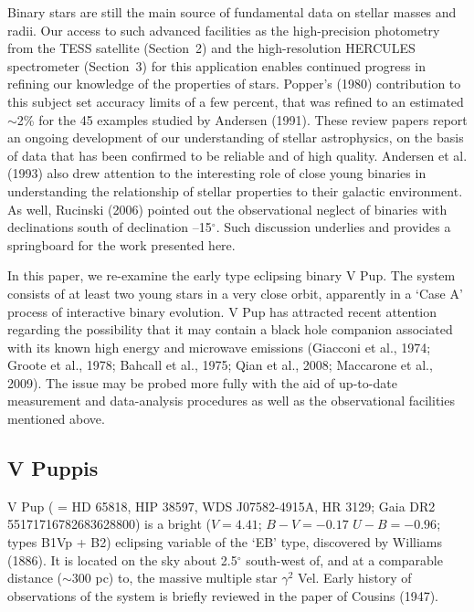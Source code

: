 \documentclass[useAMS,usenatbib]{mnras}                                                                           \usepackage[pdftex]{graphicx}
\begin{document}
Binary stars are still the main source of fundamental data on stellar masses and radii.  
Our access to such advanced facilities as the high-precision photometry
from the TESS satellite (Section~2) and
the high-resolution HERCULES spectrometer (Section~3) for this application enables 
continued progress in refining our knowledge of the properties of stars.  
Popper's (1980) contribution to this subject set accuracy limits of 
a few percent, that was refined to an estimated $\sim$2\% for the 45 
examples studied by Andersen (1991). These review papers report 
an ongoing development of our understanding of stellar astrophysics, 
on the basis of data that has been confirmed to be reliable and of high 
quality.  Andersen et al. (1993) also drew attention to the 
interesting role of close young binaries in understanding the 
relationship of stellar properties to their galactic environment.  
As well, Rucinski (2006) pointed out the observational
neglect of binaries with declinations south of declination  --15$^{\circ}$.  
Such discussion underlies and provides a springboard for the work 
presented here.  

In this paper,
we re-examine the early type eclipsing binary  V Pup.
The system consists of at least two young stars in a very close orbit,
apparently in a `Case A' process of interactive binary evolution.
 V Pup has attracted recent attention  regarding the possibility 
 that it may contain a black hole companion associated with its known
 high energy and microwave emissions (Giacconi et al.,
1974; Groote et al., 1978; Bahcall et al., 1975; Qian et al., 2008; 
Maccarone et al., 2009).
 The issue may be probed more fully  
with the aid of up-to-date measurement and data-analysis procedures 
as well as the observational facilities mentioned above. 

\subsection{V Puppis}

V Pup ( = HD 65818, HIP 38597, WDS  J07582-4915A, HR 3129; Gaia DR2 55171716782683628800)
is a bright ($V = 4.41$; $B - V = -0.17$  $ U - B = -0.96$; types B1Vp + B2)
eclipsing variable of the `EB' type, discovered by   Williams (1886).
It is located on the sky about 2.5$^{\circ}$ south-west of, and 
at a comparable distance ($\sim$300 pc) to, the massive
  multiple star $\gamma^2$ Vel.  Early history of observations
  of the system is briefly reviewed in the paper of Cousins (1947).
  
\end{document}

